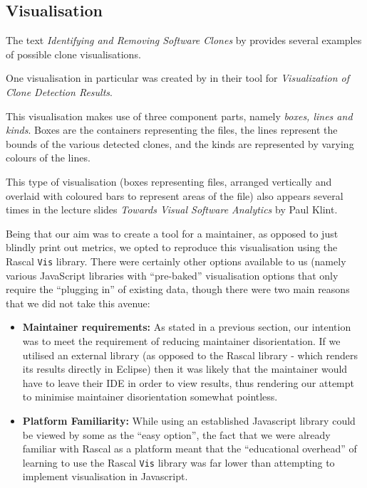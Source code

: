 \documentclass{article}
\begin{document}
\subsection{Visualisation}

The text \textit{Identifying and Removing Software Clones} by \citeauthor{Koschke2008} provides several examples of possible clone visualisations.

One visualisation in particular was created by \citeauthor{Tairas:2006:VCD:1188835.1188846} in their tool for \textit{Visualization of Clone Detection Results}\cite{Tairas:2006:VCD:1188835.1188846}.

This visualisation makes use of three component parts, namely \textit{boxes, lines and kinds}. Boxes are the containers representing the files, the lines represent the bounds of the various detected clones, and the kinds are represented by varying colours of the lines.

This type of visualisation (boxes representing files, arranged vertically and overlaid with coloured bars to represent areas of the file) also appears several times in the lecture slides \textit{Towards Visual Software Analytics} by Paul Klint\cite{klintslides}.

Being that our aim was to create a tool for a maintainer, as opposed to just blindly print out metrics, we opted to reproduce this visualisation using the Rascal \texttt{Vis} library. There were certainly other options available to us (namely various JavaScript libraries with ``pre-baked'' visualisation options that only require the ``plugging in'' of existing data, though there were two main reasons that we did not take this avenue:

\begin{itemize}
\item \textbf{Maintainer requirements:} As stated in a previous section, our intention was to meet the requirement of reducing maintainer disorientation. If we utilised an external library (as opposed to the Rascal library - which renders its results directly in Eclipse) then it was likely that the maintainer would have to leave their IDE in order to view results, thus rendering our attempt to minimise maintainer disorientation somewhat pointless.
\item \textbf{Platform Familiarity:} While using an established Javascript library could be viewed by some as the ``easy option'', the fact that we were already familiar with Rascal as a platform meant that the ``educational overhead'' of learning to use the Rascal \texttt{Vis} library was far lower than attempting to implement visualisation in Javascript.
\end{itemize}
\end{document}
